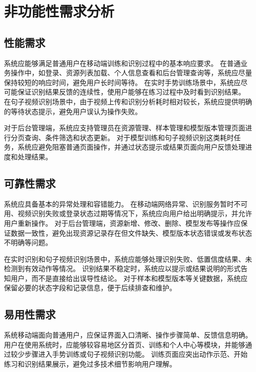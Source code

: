 
\section{非功能性需求分析}

\subsection{性能需求}

系统应能够满足普通用户在移动端训练和识别过程中的基本响应要求。
在普通业务操作中，如登录、资源列表加载、个人信息查看和后台管理查询等，系统应尽量保持较短的响应时间，避免用户长时间等待。
在实时手势训练场景中，系统应尽可能保证识别结果反馈的连续性，使用户能够在练习过程中及时看到识别结果。
在句子视频识别场景中，由于视频上传和识别分析耗时相对较长，系统应提供明确的等待状态提示，避免用户误认为操作失败。

对于后台管理端，系统应支持管理员在资源管理、样本管理和模型版本管理页面进行分页查询、条件筛选和状态更新。
对于模型训练和句子视频识别这类耗时任务，系统应避免阻塞普通页面操作，并通过状态提示或结果页面向用户反馈处理进度和处理结果。

\subsection{可靠性需求}

系统应具备基本的异常处理和容错能力。
在移动端网络异常、识别服务暂时不可用、视频识别失败或登录状态过期等情况下，系统应向用户给出明确提示，并允许用户重新操作。
对于后台管理端，资源新增、修改、删除、模型发布等操作应保证数据一致性，避免出现资源记录存在但文件缺失、模型版本状态错误或发布状态不明确等问题。

在实时识别和句子视频识别场景中，系统应能够处理识别失败、低置信度结果、未检测到有效动作等情况。
识别结果不稳定时，系统应以提示或结果说明的形式告知用户，而不是直接给出误导性结论。
对于样本和模型版本等关键数据，系统应保留必要的状态字段和记录信息，便于后续排查和维护。

\subsection{易用性需求}

系统移动端面向普通用户，应保证界面入口清晰、操作步骤简单、反馈信息明确。
用户在使用系统时，应能够较容易地区分首页、训练和个人中心等模块，并能够通过较少步骤进入手势训练或句子视频识别功能。
训练页面应突出动作示范、开始练习和识别结果展示，避免过多技术细节影响用户理解。

